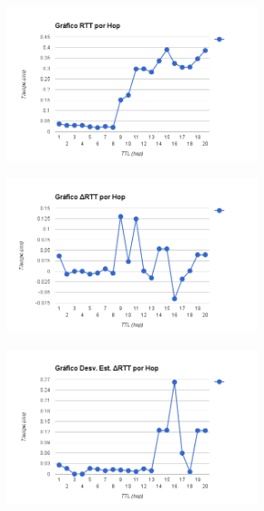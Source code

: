 \begin{figure}[h]
    \includegraphics[width=0.65\textwidth]{img_analisis1/rtt_hop.png}
    
\end{figure}

\begin{figure}[h]
    \includegraphics[width=0.65\textwidth]{img_analisis1/delta_rtt_hop.png}
    
\end{figure}

\begin{figure}[h]
    \includegraphics[width=0.65\textwidth]{img_analisis1/ds_delta_rtt_hop.png}
    
\end{figure}

